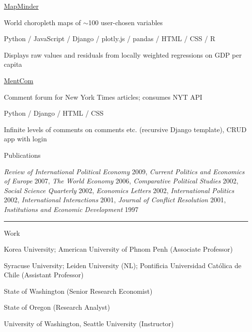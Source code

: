 \documentclass[letterpaper, english, 11pt]{article}
\newenvironment{packed_itemize}{
	\begin{itemize}
		\setlength{\itemsep}{1pt}
		\setlength{\parskip}{2pt}
		\setlength{\parsep}{2pt}
	} {\end{itemize}
}
\begin{document}
\begin{footnotesize}
	\begin{packed_itemize}
		\item{\href{https://github.com/rsspdx/mapminder}{MapMinder}}
			\begin{packed_itemize}
				\item World choropleth maps of $\sim$100 user-chosen variables
				\item Python / JavaScript  / Django / plotly.js / pandas / HTML / CSS / R
				\item Displays raw values and residuals from locally weighted regressions on GDP per capita
			\end{packed_itemize}
		\item{\href{https://github.com/rsspdx/mentcom}{MentCom}}
			\begin{packed_itemize}
				\item Comment forum for New York Times articles; consumes NYT API
				\item Python / Django / HTML / CSS
				\item Infinite levels of comments on comments etc. (recursive Django template), CRUD app with login
			\end{packed_itemize}
		\item{Publications}
			\begin{packed_itemize}
			\item  \emph{Review of International Political Economy} 2009, 
				\emph{Current Politics and Economics of Europe} 2007, 
				\emph{The World Economy} 2006, 
				\emph{Comparative Political Studies} 2002, 
				\emph{Social Science Quarterly} 2002, 
				\emph{Economics Letters} 2002, 
				\emph{International Politics} 2002, 
				\emph{International Interactions} 2001, 
				\emph{Journal of Conflict Resolution} 2001, 
				\emph{Institutions and Economic Development} 1997
		\end{packed_itemize}
	\end{packed_itemize}
\end{footnotesize}

\vspace{6pt}
\hrule

Work

\begin{footnotesize}
	\begin{packed_itemize}
		\item Korea University; American University of Phnom Penh (Associate Professor)
		\item Syracuse University; Leiden University (NL); Pontificia Universidad Cat{\'o}lica de Chile (Assistant Professor)
		\item State of Washington (Senior Research Economist)
		\item State of Oregon (Research Analyst)
		\item University of Washington, Seattle University (Instructor)
	\end{packed_itemize}
\end{footnotesize}
\end{document}
